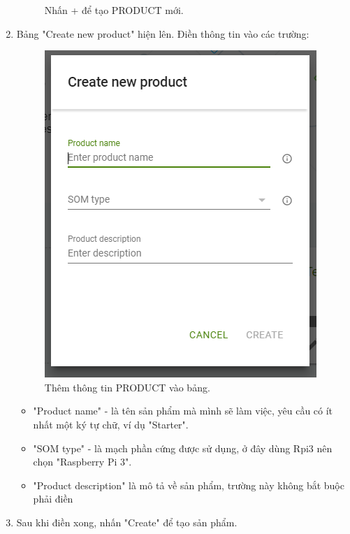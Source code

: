 \begin{enumerate}
\begin{center}
\begin{figure}[htp]
\caption{Nhấn + để tạo PRODUCT mới.}
\label{refhinh1}
\end{figure}
\end{center}
\item Bảng "Create new product" hiện lên. Điền thông tin vào các trường: 
\begin{center}
\begin{figure}[htp]
\begin{center}
\includegraphics[scale=0.8]{image3/sat3.png}
\end{center}
\caption{Thêm thông tin PRODUCT vào bảng.}
\label{refhinh1}
\end{figure}
\end{center}
\begin{itemize}
\item "Product name" - là tên sản phẩm mà mình sẽ làm việc, yêu cầu có ít nhất một ký tự chữ, ví dụ "Starter".
\item "SOM type" - là mạch phần cứng được sử dụng, ở đây dùng Rpi3 nên chọn "Raspberry Pi 3".
\item "Product description" là mô tả về sản phẩm, trường này không bắt buộc phải điền 
\end{itemize}
\item Sau khi điền xong, nhấn "Create" để tạo sản phẩm.
\begin{center}
\begin{figure}[htp]
\begin{center}

\end{center}
\end{figure}
\end{center}
\end{enumerate}
